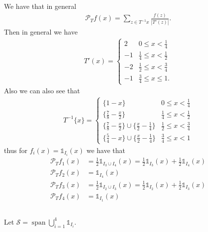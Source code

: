 \documentclass{unswmaths}
\begin{document}
\subsection{}
    We have that in general
    \begin{align}
        \mathcal{P}_T f(x) = \sum_{z \in T^{-1} x} \frac{f(z)}{|T'(z)|}.
    \end{align}
    Then in general we have
    \begin{align}
        T'(x) = 
        \begin{cases}
            2 & 0 \leq x < \frac{1}{4} \\
            -1 & \frac{1}{4} \leq x < \frac{1}{2} \\
            -2 & \frac{1}{2} \leq x < \frac{3}{4} \\
            -1 & \frac{3}{4} \leq x \leq 1.
        \end{cases}    
    \end{align}
    Also we can also see that
    \begin{align}
        T^{-1}\{x\} =
        \begin{cases}
            \{1-x\} & 0 \leq x < \frac{1}{4} \\
            \{\frac{7}{8} - \frac{x}{2} \} & \frac{1}{4} \leq x < \frac{1}{2} \\
            \{\frac{7}{8} - \frac{x}{2} \} \cup \{\frac{x}{2} - \frac{1}{4}\} & \frac{1}{2} \leq x < \frac{3}{4} \\
            \{\frac{5}{4} - x\} \cup \{ \frac{x}{2} - \frac{1}{4} \} & \frac{3}{4} \leq x < 1
        \end{cases}
    \end{align}
    thus for $ f_i(x) = \mathds{1}_{I_i}(x) $
    we have that
    \begin{align}
        \mathcal{P}_T f_1(x) &= \frac{1}{2}\mathds{1}_{I_3 \cup I_4}(x) = \frac{1}{2}\mathds{1}_{I_3}(x) + \frac{1}{2}\mathds{1}_{I_4}(x)\\
        \mathcal{P}_T f_2(x) &= \mathds{1}_{I_4}(x) \\
        \mathcal{P}_T f_3(x) &= \frac{1}{2}\mathds{1}_{I_2 \cup I_3}(x) = \frac{1}{2}\mathds{1}_{I_2}(x) + \frac{1}{2}\mathds{1}_{I_3}(x)\\
        \mathcal{P}_T f_4(x) &= \mathds{1}_{I_1}(x)
    \end{align}
\subsection{}
    Let $ \mathcal{S} = \operatorname{span} \bigcup_{i=1}^4 \mathds{1}_{I_i}$.
    
\end{document}
